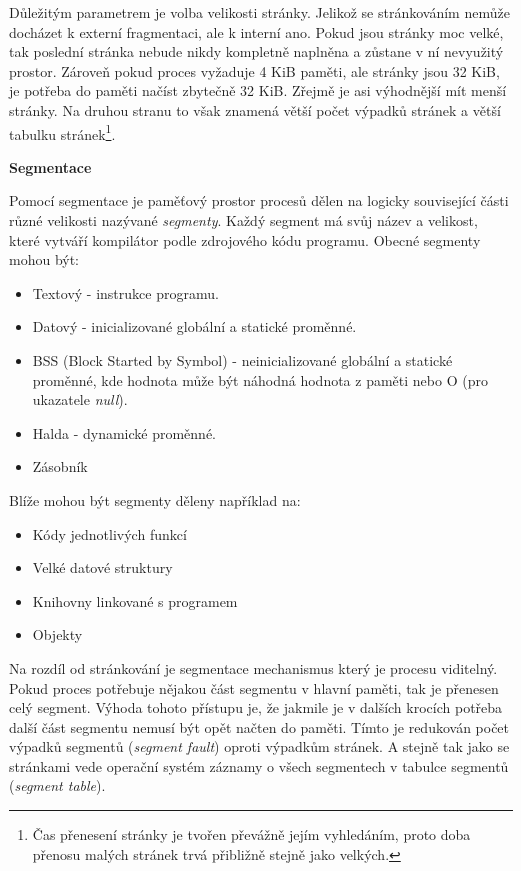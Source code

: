 Důležitým parametrem je volba velikosti stránky. Jelikož se stránkováním nemůže docházet k externí fragmentaci, ale k interní ano. Pokud jsou stránky moc velké, tak poslední stránka nebude nikdy kompletně naplněna a zůstane v ní nevyužitý prostor. Zároveň pokud proces vyžaduje 4 KiB paměti, ale stránky jsou 32 KiB, je potřeba do paměti načíst zbytečně 32 KiB. Zřejmě je asi výhodnější mít menší stránky. Na druhou stranu to však znamená větší počet výpadků stránek a větší tabulku stránek\footnote{Čas přenesení stránky je tvořen převážně jejím vyhledáním, proto doba přenosu malých stránek trvá přibližně stejně jako velkých.}. 

\newpage

\begin{Large}
    \vspace{0,5cm}
    \textbf{Segmentace}
\end{Large}

Pomocí segmentace je paměťový prostor procesů dělen na logicky související části různé velikosti nazývané \textit{segmenty}. Každý segment má svůj název a velikost, které vytváří kompilátor podle zdrojového kódu programu. Obecné segmenty mohou být:

\begin{itemize}
    \item Textový - instrukce programu.
    \item Datový - inicializované globální a statické proměnné.
    \item BSS (Block Started by Symbol) - neinicializované globální a statické proměnné, kde hodnota může být náhodná hodnota z paměti nebo O (pro ukazatele \textit{null}).
    \item Halda - dynamické proměnné.
    \item Zásobník
\end{itemize}

Blíže mohou být segmenty děleny například na:

\begin{itemize}
    \item Kódy jednotlivých funkcí
    \item Velké datové struktury
    \item Knihovny linkované s programem 
    \item Objekty
\end{itemize}

Na rozdíl od stránkování je segmentace mechanismus který je procesu viditelný. Pokud proces potřebuje nějakou část segmentu v hlavní paměti, tak je přenesen celý segment. Výhoda tohoto přístupu je, že jakmile je v dalších krocích potřeba další část segmentu nemusí být opět načten do paměti. Tímto je redukován počet výpadků segmentů (\textit{segment fault}) oproti výpadkům stránek. A stejně tak jako se stránkami vede operační systém záznamy o všech segmentech v tabulce segmentů (\textit{segment table}). 

